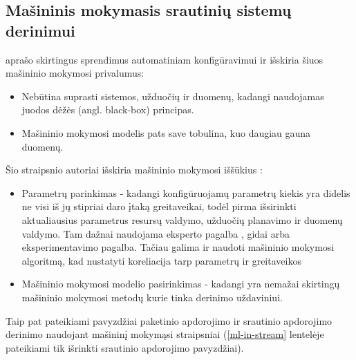 \documentclass{VUMIFPSbakalaurinis}
\begin{document}
\subsection{Mašininis mokymasis srautinių sistemų derinimui}

\cite{herodotou2020survey} aprašo skirtingus sprendimus automatiniam konfigūravimui ir išskiria šiuos mašininio mokymosi privalumus:
\begin{itemize}
    \item Nebūtina suprasti sistemos, užduočių ir duomenų, kadangi naudojamas juodos dėžės (angl. black-box) principas.
    \item Mašininio mokymosi modelis pats save tobulina, kuo daugiau gauna duomenų. 
\end{itemize}
Šio straipsnio autoriai išskiria mašininio mokymosi iššūkius : 
\begin{itemize}
    \item Parametrų parinkimas - kadangi konfigūruojamų parametrų kiekis yra didelis \cite{Bilal2017Towards, petridis2016spark} ne visi iš jų stipriai daro įtaką greitaveikai, todėl pirma išsirinkti aktualiausius parametrus resursų valdymo, užduočių planavimo ir duomenų valdymo. Tam dažnai naudojama eksperto pagalba \cite{wang2016novel}, gidai arba eksperimentavimo pagalba. Tačiau galima ir naudoti mašininio mokymosi algoritmą, kad nustatyti koreliacija tarp parametrų ir greitaveikos \cite{vaquero2018autotuning, yang2012statistics}
    \item Mašininio mokymosi modelio pasirinkimas - kadangi yra nemažai skirtingų mašininio mokymosi metodų kurie tinka derinimo uždaviniui.
\end{itemize} 
Taip pat pateikiami pavyzdžiai paketinio apdorojimo ir srautinio apdorojimo derinimo naudojant mašininį mokymąsi straipsniai (\ref{ml-in-stream} lentelėje pateikiami tik išrinkti srautinio apdorojimo pavyzdžiai).
\end{document}
